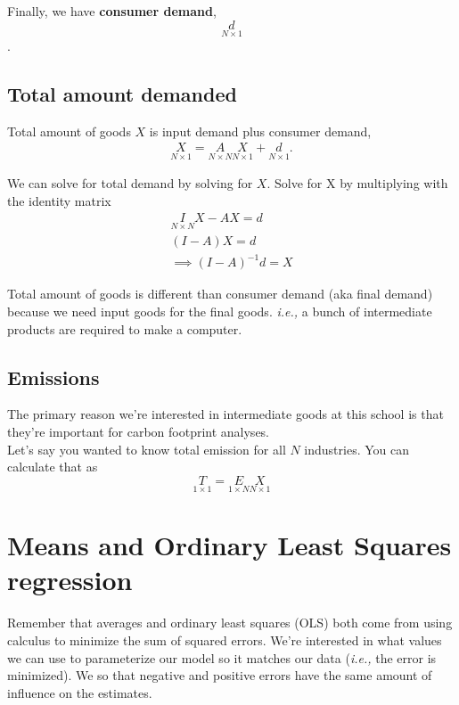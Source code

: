 \documentclass{article}
\begin{document}
Finally, we have \textbf{consumer demand}, 
\[ \underset{N \times 1}{d}\]. 

\subsection{Total amount demanded}

Total amount of goods $X$ is input demand plus consumer demand, 
\begin{align}
    \underset{N \times 1}{X} = \underset{N \times N}{A} \underset{N \times 1}{X} + \underset{N \times 1}{d}. 
 \end{align}

We can solve for total demand by solving for $X$. Solve for X by multiplying with the identity matrix 
\begin{align}
    \underset{N \times N}{I} X - AX = d\\
    (I - A) X = d\\
    \implies (I - A)^{-1}d = X
\end{align}

Total amount of goods is different than consumer demand (aka final demand) because we need input goods for the final goods. \textit{i.e.,} a bunch of intermediate products are required to make a computer. 

\subsection{Emissions}
The primary reason we're interested in intermediate goods at this school is that they're important for carbon footprint analyses. \\

Let's say you wanted to know total emission for all $N$ industries. You can calculate that as 
\[\underset{1 \times 1}{T} = \underset{1 \times N}{E} \underset{N\times1}{X} \]

\section{Means and Ordinary Least Squares regression}

Remember that averages and ordinary least squares (OLS) both come from using calculus to minimize the sum of squared errors. We're interested in what values we can use to parameterize our model so it matches our data (\textit{i.e.,} the error is minimized). We so that negative and positive errors have the same amount of influence on the estimates. 
\end{document}
